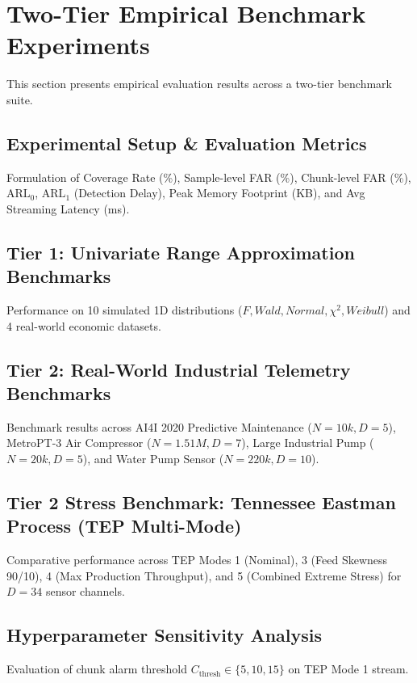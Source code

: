 \documentclass[a4paper,fleqn]{cas-sc}
\begin{document}
\section{Two-Tier Empirical Benchmark Experiments}\label{sec5_experiments}
This section presents empirical evaluation results across a two-tier benchmark suite.

\subsection{Experimental Setup \& Evaluation Metrics}
Formulation of Coverage Rate (\%), Sample-level FAR (\%), Chunk-level FAR (\%), $\text{ARL}_0$, $\text{ARL}_1$ (Detection Delay), Peak Memory Footprint (KB), and Avg Streaming Latency (ms).

\subsection{Tier 1: Univariate Range Approximation Benchmarks}
Performance on 10 simulated 1D distributions ($F, Wald, Normal, \chi^2, Weibull$) and 4 real-world economic datasets.

\subsection{Tier 2: Real-World Industrial Telemetry Benchmarks}
Benchmark results across AI4I 2020 Predictive Maintenance ($N=10k, D=5$), MetroPT-3 Air Compressor ($N=1.51M, D=7$), Large Industrial Pump ($N=20k, D=5$), and Water Pump Sensor ($N=220k, D=10$).

\subsection{Tier 2 Stress Benchmark: Tennessee Eastman Process (TEP Multi-Mode)}
Comparative performance across TEP Modes 1 (Nominal), 3 (Feed Skewness 90/10), 4 (Max Production Throughput), and 5 (Combined Extreme Stress) for $D=34$ sensor channels.

\subsection{Hyperparameter Sensitivity Analysis}
Evaluation of chunk alarm threshold $C_{\text{thresh}} \in \{5, 10, 15\}$ on TEP Mode 1 stream.
\end{document}
